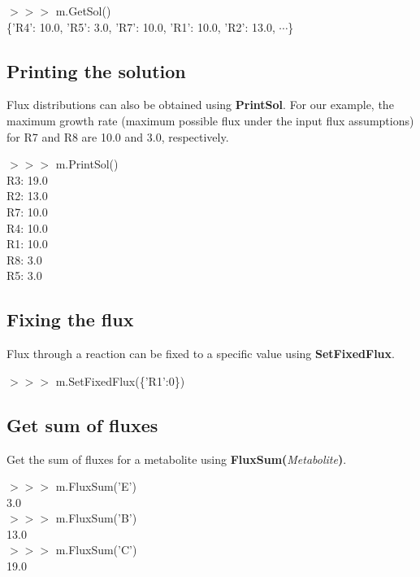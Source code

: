 \begin{framed}
$>>>$ m.GetSol()\\
\{'R4': 10.0, 'R5': 3.0, 'R7': 10.0, 'R1': 10.0, 'R2': 13.0, $\cdots$\}
\end{framed}


\subsection{Printing the solution}
\label{sec:print}

Flux distributions can also be obtained using \textbf{PrintSol}. For our example, the maximum growth rate (maximum possible flux under the input flux assumptions) for R7 and R8 are 10.0 and 3.0, respectively.

\begin{framed}
$>>>$ m.PrintSol()\\
R3: 19.0\\
R2: 13.0\\
R7: 10.0\\
R4: 10.0\\
R1: 10.0\\
R8: 3.0\\
R5: 3.0
\end{framed}


\subsection{Fixing the flux}

Flux through a reaction can be fixed to a specific value using \textbf{SetFixedFlux}.

\begin{framed}
$>>>$ m.SetFixedFlux(\{'R1':0\})
\end{framed}


\subsection{Get sum of fluxes}

Get the sum of fluxes for a metabolite using \textbf{FluxSum(}\textit{Metabolite}\textbf{)}.

\begin{framed}
$>>>$ m.FluxSum('E')\\
3.0\\

$>>>$ m.FluxSum('B')\\
13.0\\

$>>>$ m.FluxSum('C')\\ %
19.0
\end{framed}

